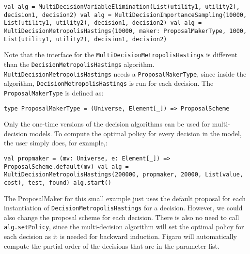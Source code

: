 \begin{flushleft}
\texttt{val alg = MultiDecisionVariableElimination(List(utility1, utility2), decision1, decision2)
\newline val alg = MultiDecisionImportanceSampling(10000,	List(utility1, utility2), decision1, decision2)
\newline val alg = MultiDecisionMetropolisHastings(10000, maker: ProposalMakerType, 1000, List(utility1, utility2), decision1, decision2)
}
\end{flushleft}

Note that the interface for the \texttt{MultiDecisionMetropolisHastings} is different than the \texttt{DecisionMetropolisHastings} algorithm. \texttt{MultiDec\-isionMetropolisHastings} needs a \texttt{ProposalMakerType}, since inside the algorithm, \texttt{Decision\-MetropolisHastings} is run for each decision. The \texttt{ProposalMakerType} is defined as:

\begin{flushleft}
\texttt{type ProposalMakerType = (Universe, Element[\_]) => ProposalScheme}
\end{flushleft}

Only the one-time versions of the decision algorithms can be used for multi-decision models. To compute the optimal policy for every decision in the model, the user simply does, for example,:

\begin{flushleft}
\texttt{val propmaker = (mv: Universe, e: Element[\_]) => ProposalScheme.default(mv)
\newline val alg = MultiDecisionMetropolisHastings(200000, propmaker, 20000, List(value, cost), test, found)
\newline alg.start()}
\end{flushleft}

The ProposalMaker for this small example just uses the default proposal for each instantiation of \texttt{DecisionMetropolisHastings} for a decision. However, we could also change the proposal scheme for each decision. There is also no need to call \texttt{alg.setPolicy}, since the multi-decision algorithm will set the optimal policy for each decision as it is needed for backward induction. Figaro will automatically compute the partial order of the decisions that are in the parameter list.
